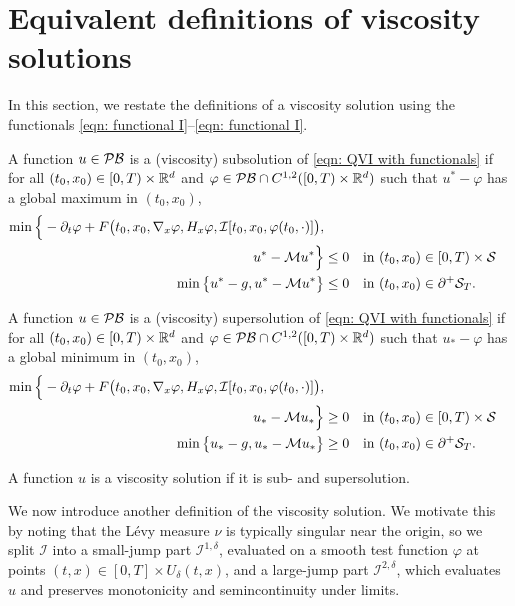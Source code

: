 \section{Equivalent definitions of viscosity solutions}
\label{section: Equivalent Definitions of Viscosity Solutions}
In this section, we restate the definitions of a viscosity solution using the functionals \eqref{eqn: functional I}--\eqref{eqn: functional I}.

\begin{definition}
\label{def: Viscosity solution 1}
    A function $u \in \mathcal{PB}$ is a (viscosity) subsolution of \eqref{eqn: QVI with functionals} if for all $(t_0,x_0) \in [0,T) \times \mathbb{R}^d$ and $\varphi \in \mathcal{PB} \cap C^{1,2}([0,T) \times \mathbb{R}^d)$ such that $u^* - \varphi$ has a global maximum in $(t_0,x_0)$, 
    \begin{align*}
        \min \Big\{ - \partial_t \varphi + F\big(t_0,x_0,\nabla_x \varphi, H_x \varphi, \mathcal{I}[t_0,x_0,\varphi(t_0,\cdot)] \big), \\
        u^* - \mathcal{M} u^* \Big\} &\leq 0 \quad \text{in } (t_0,x_0) \in [0,T) \times \mathcal{S} \\
        \min \big\{ u^* - g, u^* - \mathcal{M} u^* \big\} & \leq 0 \quad \text{in } (t_0,x_0) \in \partial^+ \mathcal{S}_T.
    \end{align*}

    A function $u \in \mathcal{PB}$ is a (viscosity) supersolution of \eqref{eqn: QVI with functionals} if for all $(t_0,x_0) \in [0,T) \times \mathbb{R}^d$ and $\varphi \in \mathcal{PB} \cap C^{1,2}([0,T) \times \mathbb{R}^d)$ such that $u_* - \varphi$ has a global minimum in $(t_0,x_0)$, 
    \begin{align*}
        \min \Big\{ - \partial_t \varphi + F\big(t_0,x_0, \nabla_x \varphi, H_x \varphi, \mathcal{I}[t_0,x_0,\varphi(t_0,\cdot)] \big), \\
        u_* - \mathcal{M} u_* \Big\} &\geq 0 \quad \text{in } (t_0,x_0) \in [0,T) \times \mathcal{S} \\
        \min \big\{ u_* - g, u_* - \mathcal{M} u_* \big\} & \geq 0 \quad \text{in } (t_0,x_0) \in \partial^+ \mathcal{S}_T.
    \end{align*}

    A function $u$ is a viscosity solution if it is sub- and supersolution. 
\end{definition}

We now introduce another definition of the viscosity solution. We motivate this by noting that the Lévy measure $\nu$ is typically singular near the origin, so we split $\mathcal I$ into a small-jump part $\mathcal I^{1,\delta}$, evaluated on a smooth test function $\varphi$ at points $(t,x) \in [0,T] \times U_\delta(t,x)$, and a large-jump part $\mathcal I^{2,\delta}$, which evaluates $u$ and preserves monotonicity and semincontinuity under limits. 

